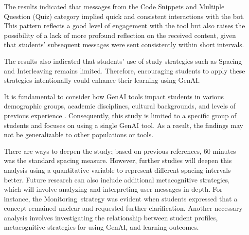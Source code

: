 \documentclass[a4paper,twoside]{article}
\begin{document}
The results indicated that messages from the Code Snippets and Multiple Question
(Quiz) category implied quick and consistent interactions with the bot. This
pattern reflects a good level of engagement with the tool but also raises the
possibility of a lack of more profound reflection on the received content, given
that students' subsequent messages were sent consistently within short intervals.

The results also indicated that students' use of study strategies such
as Spacing and Interleaving remains limited. Therefore, encouraging students to
apply these strategies intentionally could enhance their learning using GenAI.

It is fundamental to consider how GenAI tools impact students in various
demographic groups, academic disciplines, cultural backgrounds, and levels of
previous experience \citep{catalan21} \citep{neo22}. Consequently, this study is
limited to a specific group of students and focuses on using a single GenAI
tool. As a result, the findings may not be generalizable to other populations or
tools.

There are ways to deepen the study; based on previous references, 60 minutes was
the standard spacing measure. However, further studies will deepen this analysis
using a quantitative variable to represent different spacing intervals better.
Future research can also include additional metacognitive strategies, which will
involve analyzing and interpreting user messages in depth. For instance, the
Monitoring strategy was evident when students expressed that a concept remained
unclear and requested further clarification. Another necessary analysis involves
investigating the relationship between student profiles, metacognitive
strategies for using GenAI, and learning outcomes.


{\small
}
\end{document}

